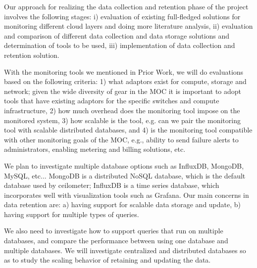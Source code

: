 Our approach for realizing the data collection and retention phase of the project involves the following stages: i) evaluation of existing full-fledged solutions for monitoring different cloud layers and doing more literature analysis, ii) evaluation and comparison of different data collection and data storage solutions and determination of tools to be used, iii) implementation of data collection and retention solution. 

With the monitoring tools we mentioned in Prior Work, we will do evaluations based on the following criteria: 1) what adaptors exist for compute, storage and network; given the wide diversity of gear in the MOC it is important to adopt tools that have existing adaptors for the specific switches and compute infrastructure, 2) how much overhead does the monitoring tool impose on the monitored system, 3) how scalable is the tool, e.g. can we pair the monitoring tool with scalable distributed databases, and 4) is the monitoring tool compatible with other monitoring goals of the MOC, e.g., ability to send failure alerts to administrators, enabling metering and billing solutions, etc.

We plan to investigate multiple database options such as InfluxDB, MongoDB, MySQL, etc... MongoDB is a distributed NoSQL database, which is the default database used by ceilometer; InfluxDB is a time series database, which incorporates well with visualization tools such as Grafana. Our main concerns in data retention are: a) having support for scalable data storage and update, b) having support for multiple types of queries.

We also need to investigate how to support queries that run on multiple databases, and compare the performance between using one database and multiple databases. We will investigate centralized and distributed databases so as to study the scaling behavior of retaining and updating the data. 
